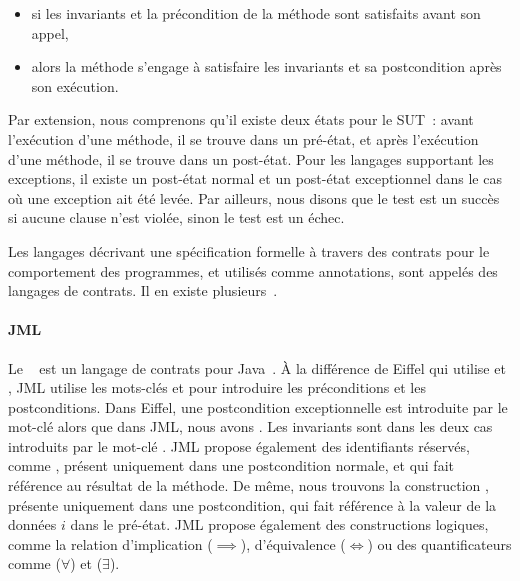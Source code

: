 \begin{itemize}

\item si les invariants et la précondition de la méthode sont satisfaits avant
son appel,

\item alors la méthode s'engage à satisfaire les invariants et sa postcondition
après son exécution.

\end{itemize}

Par extension, nous comprenons qu'il existe deux états pour le SUT~: avant
l'exécution d'une méthode, il se trouve dans un {\strong pré-état}, et après
l'exécution d'une méthode, il se trouve dans un {\strong post-état}. Pour les
langages supportant les exceptions, il existe un post-état normal et un
post-état exceptionnel dans le cas où une exception ait été levée. Par ailleurs,
nous disons que le test est un {\strong succès} si aucune clause n'est violée,
sinon le test est un {\strong échec}.

Les langages décrivant une spécification formelle à travers des contrats pour le
comportement des programmes, et utilisés comme annotations, sont appelés des
{\strong langages de contrats}. Il en existe plusieurs~.

\paragraph{JML} Le ~ est un langage
de contrats pour Java~. À la différence de Eiffel qui utilise
 et , JML utilise les mots-clés  et
 pour introduire les préconditions et les postconditions. Dans
Eiffel, une postcondition exceptionnelle est introduite par le mot-clé
 alors que dans JML, nous avons . Les invariants sont
dans les deux cas introduits par le mot-clé . JML propose
également des identifiants réservés, comme \aresult, présent uniquement dans une
postcondition normale, et qui fait référence au résultat de la méthode.  De
même, nous trouvons la construction , présente uniquement dans une
postcondition, qui fait référence à la valeur de la données $i$ dans le
pré-état. JML propose également des constructions logiques, comme la relation
d'implication ($\implies$), d'équivalence ($\Longleftrightarrow$) ou des
quantificateurs comme  ($\forall$) et
 ($\exists$).

